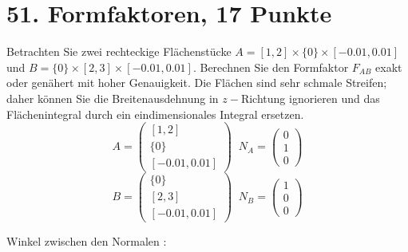\documentclass[11pt]{article}
\begin{document}
\section*{51. Formfaktoren, 17 Punkte}
Betrachten Sie zwei rechteckige Flächenstücke $A = [1, 2] \times \{0\} \times [-0.01, 0.01]$ und $B = \{0\} \times [2, 3] \times [-0.01, 0.01]$. Berechnen Sie den Formfaktor $F_{AB}$ exakt oder genähert mit hoher Genauigkeit. Die Flächen sind sehr schmale Streifen; daher können Sie die Breitenausdehnung in $z-$Richtung ignorieren und das Flächenintegral durch ein eindimensionales Integral ersetzen.
$$ A = 
\begin{pmatrix}
[1, 2] \\
\{0\} \\
[-0.01, 0.01]
\end{pmatrix} \;\;
N_{A} = 
\begin{pmatrix}
0 \\ 1 \\ 0
\end{pmatrix}
$$
$$B = \begin{pmatrix}
\{0\} \\ [2, 3] \\ [-0.01, 0.01]
\end{pmatrix}
\;\; 
N_{B} = 
\begin{pmatrix}
1 \\ 0 \\ 0
\end{pmatrix}
$$

Winkel zwischen den Normalen :
\end{document}
